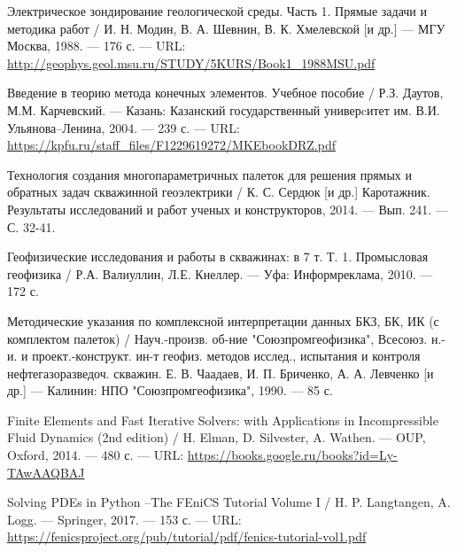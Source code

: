 \begingroup 
\renewcommand{\section}[2]{\anonsection{Библиографический список}}
\begin{thebibliography}{00}

    Электрическое зондирование геологической среды. Часть 1. Прямые задачи и методика работ /
    И. Н. Модин, В. А. Шевнин, В. К. Хмелевской [и др.]
    --- МГУ Москва, 1988.
    --- 176 с.
    --- URL: \url{http://geophys.geol.msu.ru/STUDY/5KURS/Book1_1988MSU.pdf}

    Введение в теорию метода конечных элементов. Учебное пособие /
    Р.З. Даутов, М.М. Карчевский.
    --- Казань: Казанский государственный универcитет им. В.И. Ульянова–Ленина, 2004.
    --- 239 с.
    --- URL: \url{https://kpfu.ru/staff_files/F1229619272/MKEbookDRZ.pdf}

    Технология создания многопараметричных
    палеток для решения прямых и обратных задач
    скважинной геоэлектрики /
    К. С. Сердюк [и др.]
    Каротажник. Результаты исследований и работ ученых и конструкторов, 2014.
    --- Вып. 241.
    --- С. 32-41.

    Геофизические исследования и работы в скважинах: в 7 т. Т. 1.
    Промысловая геофизика /
    Р.А. Валиуллин, Л.Е. Кнеллер.
    --- Уфа: Информреклама, 2010.
    --- 172 с.


    Методические указания по комплексной интерпретации данных БКЗ, БК, ИК (с комплектом палеток) /
    Науч.-произв. об-ние "Союзпромгеофизика", Всесоюз. н.-и. и проект.-конструкт. ин-т геофиз. методов исслед., испытания и контроля нефтегазоразведоч. скважин. Е. В. Чаадаев, И. П. Бриченко, А. А. Левченко [и др.]
    --- Калинин: НПО "Союзпромгеофизика", 1990.
    --- 85 с.
   
    Finite Elements and Fast Iterative Solvers: with Applications in Incompressible Fluid Dynamics (2nd edition) /
    H. Elman, D. Silvester, A. Wathen.
    --- OUP, Oxford, 2014. 
    --- 480 с.
    --- URL: \url{https://books.google.ru/books?id=Ly-TAwAAQBAJ}

    Solving PDEs in Python --The FEniCS Tutorial Volume I /
    H. P. Langtangen, A. Logg.
    --- Springer, 2017.
    --- 153 с.
    --- URL: \url{https://fenicsproject.org/pub/tutorial/pdf/fenics-tutorial-vol1.pdf}

\end{thebibliography}
\endgroup

\clearpage
